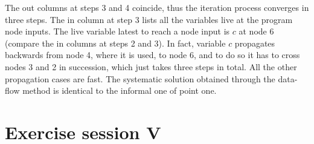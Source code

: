 \documentclass[12pt, a4paper]{report}
\newtheorem[style=M,bodystyle=\normalfont]{theorem}{Theorem}
\newtheorem[style=M,bodystyle=\normalfont]{corollary}{Corollary}
\newtheorem[style=M,bodystyle=\normalfont]{lemma}{Lemma}
\newtheorem[style=M,bodystyle=\normalfont]{definition}{Definition}
\begin{document}
\begin{enumerate}
\begin{figure}[H]
                \end{figure} 
                The out columns at steps 3 and 4 coincide, thus the iteration process converges in three steps. The in column at step 3 lists all the variables
                live at the program node inputs. The live variable latest to reach a node input is $c$ at node 6 (compare the in columns at steps 2 and 3). In fact, 
                variable $c$ propagates backwards from node 4, where it is used, to node 6, and to do so it has to cross nodes 3 and 2 in succession, which just takes 
                three steps in total. All the other propagation cases are fast. The systematic solution obtained through the data-flow method is identical to the informal 
                one of point one. 
        \end{enumerate}

\newpage 

\chapter{Exercise session V}
\end{document}
